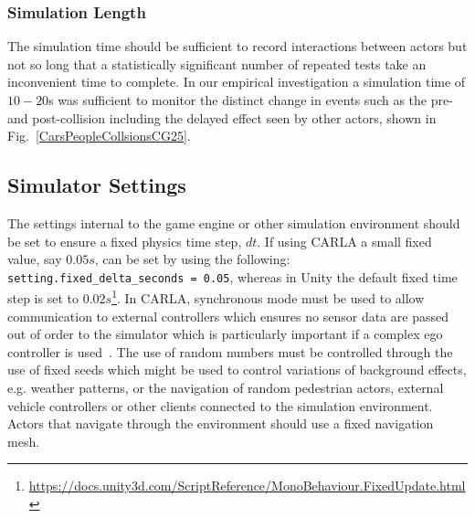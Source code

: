 \documentclass[letterpaper, 10 pt, journal, twoside]{IEEEtran}
\begin{document}


\subsubsection{Simulation Length} 
The simulation time should be sufficient to record interactions between actors but not so long that 
a statistically significant number 
of repeated tests take an inconvenient time to complete. In our empirical investigation a simulation time of $10-20$s was sufficient to monitor the distinct change in events such as the pre- and post-collision including the delayed effect seen by other actors, shown in Fig.~\ref{CarsPeopleCollsionsCG25}.



\subsection{Simulator Settings}
The settings internal to the game engine or other simulation environment should be set to ensure a fixed physics time step, $dt$. If using CARLA a small fixed value, say $0.05s$, can be set by using the following: \texttt{setting.fixed\_delta\_seconds = 0.05}, whereas in Unity the default fixed time step is set to $0.02s$\footnote{\url{https://docs.unity3d.com/ScriptReference/MonoBehaviour.FixedUpdate.html}}. In CARLA, synchronous mode must be used to allow communication to external controllers which ensures no sensor data are passed out of order to the simulator which is particularly important if a complex ego controller is used~\cite{carla_sim_config}. 
%
The use of random numbers must be controlled through the use of fixed seeds which might be used to control variations of background effects, e.g. weather patterns, or the navigation of random pedestrian actors, external vehicle controllers or other clients connected to the simulation environment. 
%
Actors that navigate through the environment should use a fixed navigation mesh. 
\end{document}

